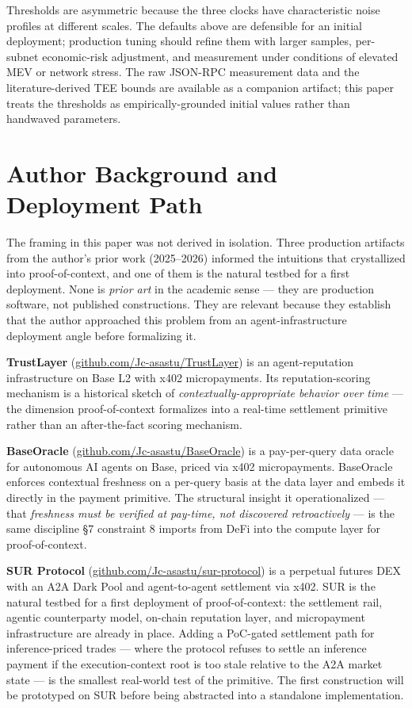\documentclass[11pt]{article}
\begin{document}
Thresholds are asymmetric because the three clocks have characteristic noise profiles at different scales. The defaults above are defensible for an initial deployment; production tuning should refine them with larger samples, per-subnet economic-risk adjustment, and measurement under conditions of elevated MEV or network stress. The raw JSON-RPC measurement data and the literature-derived TEE bounds are available as a companion artifact; this paper treats the thresholds as empirically-grounded initial values rather than handwaved parameters.

\section{Author Background and Deployment Path}

The framing in this paper was not derived in isolation. Three production artifacts from the author's prior work (2025--2026) informed the intuitions that crystallized into proof-of-context, and one of them is the natural testbed for a first deployment. None is \emph{prior art} in the academic sense --- they are production software, not published constructions. They are relevant because they establish that the author approached this problem from an agent-infrastructure deployment angle before formalizing it.

\textbf{TrustLayer} (\href{https://github.com/Jc-asastu/TrustLayer}{github.com/Jc-asastu/TrustLayer}) is an agent-reputation infrastructure on Base L2 with x402 micropayments. Its reputation-scoring mechanism is a historical sketch of \emph{contextually-appropriate behavior over time} --- the dimension proof-of-context formalizes into a real-time settlement primitive rather than an after-the-fact scoring mechanism.

\textbf{BaseOracle} (\href{https://github.com/Jc-asastu/BaseOracle}{github.com/Jc-asastu/BaseOracle}) is a pay-per-query data oracle for autonomous AI agents on Base, priced via x402 micropayments. BaseOracle enforces contextual freshness on a per-query basis at the data layer and embeds it directly in the payment primitive. The structural insight it operationalized --- that \emph{freshness must be verified at pay-time, not discovered retroactively} --- is the same discipline \S7 constraint 8 imports from DeFi into the compute layer for proof-of-context.

\textbf{SUR Protocol} (\href{https://github.com/Jc-asastu/sur-protocol}{github.com/Jc-asastu/sur-protocol}) is a perpetual futures DEX with an A2A Dark Pool and agent-to-agent settlement via x402. SUR is the natural testbed for a first deployment of proof-of-context: the settlement rail, agentic counterparty model, on-chain reputation layer, and micropayment infrastructure are already in place. Adding a PoC-gated settlement path for inference-priced trades --- where the protocol refuses to settle an inference payment if the execution-context root is too stale relative to the A2A market state --- is the smallest real-world test of the primitive. The first construction will be prototyped on SUR before being abstracted into a standalone implementation.
\end{document}
